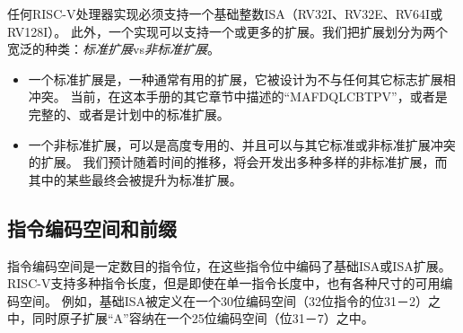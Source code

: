 任何RISC-V处理器实现必须支持一个基础整数ISA（RV32I、RV32E、RV64I或RV128I）。
此外，一个实现可以支持一个或更多的扩展。我们把扩展划分为两个宽泛的种类：{\em 标准扩展}vs{\em 非标准扩展}。
\begin{itemize}
\item 一个标准扩展是，一种通常有用的扩展，它被设计为不与任何其它标志扩展相冲突。
当前，在这本手册的其它章节中描述的“MAFDQLCBTPV”，或者是完整的、或者是计划中的标准扩展。
\item 一个非标准扩展，可以是高度专用的、并且可以与其它标准或非标准扩展冲突的扩展。
  我们预计随着时间的推移，将会开发出多种多样的非标准扩展，而其中的某些最终会被提升为标准扩展。
\end{itemize}

\vspace{-0.2in}
\subsection*{指令编码空间和前缀}

指令编码空间是一定数目的指令位，在这些指令位中编码了基础ISA或ISA扩展。
RISC-V支持多种指令长度，但是即使在单一指令长度中，也有各种尺寸的可用编码空间。
例如，基础ISA被定义在一个30位编码空间（32位指令的位31－2）之中，同时原子扩展“A”容纳在一个25位编码空间（位31－7）之中。

